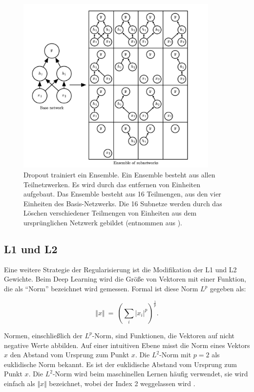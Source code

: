         \begin{figure}[H]
            \centering
            \includegraphics[width=10cm]{kapitel2/dropout.png}
            \caption[Basis-Netzwerks und Ensemble im Vergleich]{Dropout trainiert ein Ensemble. Ein Ensemble besteht aus allen Teilnetzwerken. Es wird durch das entfernen von Einheiten aufgebaut. Das Ensemble besteht aus 16 Teilmengen, aus den vier Einheiten des Basis-Netzwerks. Die 16 Subnetze werden durch das Löschen verschiedener Teilmengen von Einheiten aus dem ursprünglichen Netzwerk gebildet (entnommen aus \cite*[260]{IanGoodfellowYoshuaBengio2016}).}
            \label{Kap2:Dropout}
        \end{figure}

        \subsection{L1 und L2}
        Eine weitere Strategie der Regularisierung ist die Modifikation der L1 und L2 Gewichte. Beim Deep Learning wird die Größe von Vektoren mit einer Funktion, die als \enquote{Norm} bezeichnet wird \cite*[39]{IanGoodfellowYoshuaBengio2016} gemessen. Formal ist diese Norm $L^p$ gegeben als:

        \begin{equation} \label{FormelNorm2}
            \Vert x\Vert \ =\ \left(\sum _{i}\bigr| x_{i}\bigr|^{p}\right)^{\frac{1}{p}}.
        \end{equation}

        Normen, einschließlich der $L^p$-Norm, sind Funktionen, die Vektoren auf nicht negative Werte abbilden. Auf einer intuitiven Ebene misst die Norm eines Vektors $x$ den Abstand vom Ursprung zum Punkt $x$. Die $L^2$-Norm mit $p = 2$ als euklidische Norm bekannt. Es ist der euklidische Abstand vom Ursprung zum Punkt $x$. Die $L^2$-Norm wird beim maschinellen Lernen häufig verwendet, sie wird einfach als $\Vert x\Vert$ bezeichnet, wobei der Index 2 weggelassen wird \cite*[39]{IanGoodfellowYoshuaBengio2016}.

